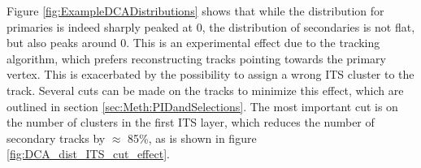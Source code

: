 Figure \ref{fig:ExampleDCADistributions} shows that while the distribution for primaries is indeed sharply peaked at 0, the distribution of secondaries is not flat, but also peaks around 0. This is an experimental effect due to the tracking algorithm, which prefers reconstructing tracks pointing towards the primary vertex. This is exacerbated by the possibility to assign a wrong ITS cluster to the track. Several cuts can be made on the tracks to minimize this effect, which are outlined in section \ref{sec:Meth:PIDandSelections}. The most important cut is on the number of clusters in the first ITS layer, which reduces the number of secondary tracks by $\approx$ 85\%, as is shown in figure \ref{fig:DCA_dist_ITS_cut_effect}. 
\\

